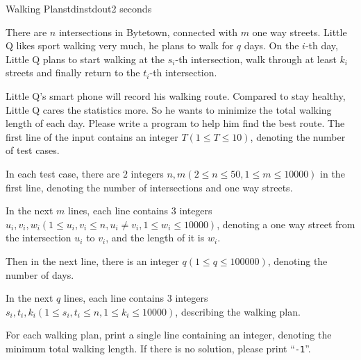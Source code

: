 \documentclass[11pt,a4paper,oneside]{article}
\newcommand{\txt}[1]{\mbox{``\texttt{#1}''}}
\newcommand{\timeLimit}{2 seconds}
\begin{document}
\begin{problem}{Walking Plan}{stdin}{stdout}{\timeLimit}

There are $n$ intersections in Bytetown, connected with $m$ one way streets. Little Q likes sport walking very much, he plans to walk for $q$ days. On the $i$-th day, Little Q plans to start walking at the $s_i$-th intersection, walk through at least $k_i$ streets and finally return to the $t_i$-th intersection.\par
Little Q's smart phone will record his walking route. Compared to stay healthy, Little Q cares the statistics more. So he wants to minimize the total walking length of each day. Please write a program to help him find the best route.
\InputFile
The first line of the input contains an integer $T(1\leq T\leq10)$, denoting the number of test cases.\par
In each test case, there are $2$ integers $n,m(2\leq n\leq 50,1\leq m\leq 10000)$ in the first line, denoting the number of intersections and one way streets.\par
In the next $m$ lines, each line contains $3$ integers $u_i,v_i,w_i(1\leq u_i,v_i\leq n,u_i\neq v_i,1\leq w_i\leq 10000)$, denoting a one way street from the intersection $u_i$ to $v_i$, and the length of it is $w_i$.\par
Then in the next line, there is an integer $q(1\leq q\leq 100000)$, denoting the number of days.\par
In the next $q$ lines, each line contains $3$ integers $s_i,t_i,k_i(1\leq s_i,t_i\leq n,1\leq k_i\leq 10000)$, describing the walking plan.

\OutputFile
For each walking plan, print a single line containing an integer, denoting the minimum total walking length. If there is no solution, please print \txt{-1}.

\Examples
\begin{example}
%
\end{example}
\end{problem}
\end{document}
